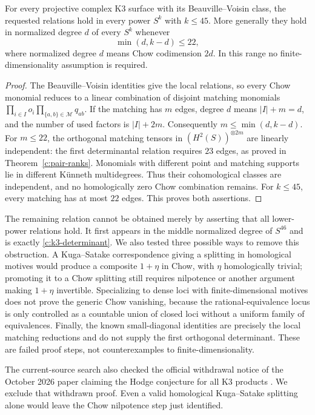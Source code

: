 \begin{corollary}
\label{c:k3-stable-range}
For every projective complex K3 surface with its Beauville--Voisin class, the requested relations hold in every power $S^k$ with $k\leq45$. More generally they hold in normalized degree $d$ of every $S^k$ whenever
\[
 \min(d,k-d)\leq22,
\]
where normalized degree $d$ means Chow codimension $2d$. In this range no finite-dimensionality assumption is required.
\end{corollary}

\begin{proof}
The Beauville--Voisin identities give the local relations, so every Chow monomial reduces to a linear combination of disjoint matching monomials
$\prod_{i\in I}o_i\prod_{\{a,b\}\in\mathcal M}q_{ab}$.
If the matching has $m$ edges, degree $d$ means $|I|+m=d$, and the number of used factors is $|I|+2m$. Consequently $m\leq\min(d,k-d)$. For $m\leq22$, the orthogonal matching tensors in $(H^2(S))^{\otimes2m}$ are linearly independent: the first determinantal relation requires $23$ edges, as proved in Theorem~\ref{c:pair-ranks}. Monomials with different point and matching supports lie in different K\"unneth multidegrees. Thus their cohomological classes are independent, and no homologically zero Chow combination remains. For $k\leq45$, every matching has at most $22$ edges. This proves both assertions.
\end{proof}

The remaining relation cannot be obtained merely by asserting that all lower-power relations hold. It first appears in the middle normalized degree of $S^{46}$ and is exactly \eqref{c:k3-determinant}. We also tested three possible ways to remove this obstruction. A Kuga--Satake correspondence giving a splitting in homological motives would produce a composite $1+\eta$ in Chow, with $\eta$ homologically trivial; promoting it to a Chow splitting still requires nilpotence or another argument making $1+\eta$ invertible. Specializing to dense loci with finite-dimensional motives does not prove the generic Chow vanishing, because the rational-equivalence locus is only controlled as a countable union of closed loci without a uniform family of equivalences. Finally, the known small-diagonal identities are precisely the local matching reductions and do not supply the first orthogonal determinant. These are failed proof steps, not counterexamples to finite-dimensionality.

The current-source search also checked the official withdrawal notice of the October 2026 paper claiming the Hodge conjecture for all K3 products \citep{c_k3withdrawal2026}. We exclude that withdrawn proof. Even a valid homological Kuga--Satake splitting alone would leave the Chow nilpotence step just identified.

